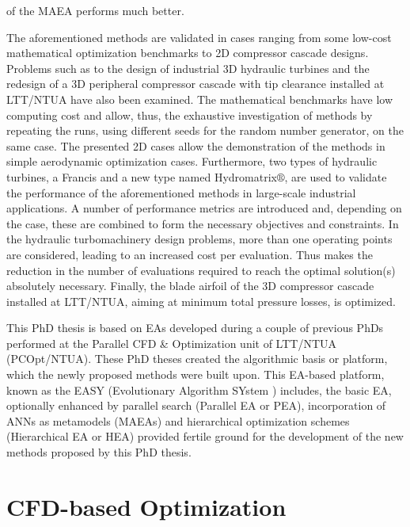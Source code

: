of the MAEA performs much better.  

The aforementioned methods are validated in cases ranging from  some low-cost mathematical optimization benchmarks to 2D compressor cascade designs. Problems such as to the design of industrial 3D hydraulic turbines and the redesign of a 3D peripheral compressor cascade with tip clearance installed at LTT/NTUA have also been examined. The mathematical benchmarks have low computing cost and allow, thus, the exhaustive investigation of methods by repeating the runs, using different seeds for the random number generator, on the same case. The presented 2D cases allow the demonstration of the methods in simple aerodynamic optimization cases. Furthermore, two types of hydraulic turbines, a Francis and a new type named Hydromatrix$\circledR$, are used to validate the performance of the aforementioned methods in large-scale industrial applications. A number of performance metrics are introduced and, depending on the case, these are combined to form the necessary objectives and constraints. In the hydraulic turbomachinery design problems, more than one operating points are considered, leading to an increased cost per evaluation. Thus makes the reduction in the number of evaluations required to reach the optimal solution(s) absolutely necessary.  Finally, the blade airfoil of the 3D compressor cascade installed at LTT/NTUA, aiming at minimum total pressure losses, is optimized.     


This PhD thesis is based on EAs developed during a couple of previous PhDs \cite{phd_Giotis,phd_Karakasis,phd_Kampolis,phd_Vera} performed at the Parallel CFD \& Optimization unit of LTT/NTUA (PCOpt/NTUA). These PhD theses created the algorithmic basis or platform,  which the newly proposed methods were built upon. This EA-based platform, known as the EASY (Evolutionary Algorithm SYstem \cite{EASYsite}) includes, the basic EA, optionally enhanced by parallel search (Parallel EA or PEA), incorporation of ANNs as metamodels (MAEAs) and hierarchical optimization schemes (Hierarchical EA or HEA) provided fertile ground for the development of the new methods proposed by this PhD thesis.                       
 

\section{CFD-based Optimization}

